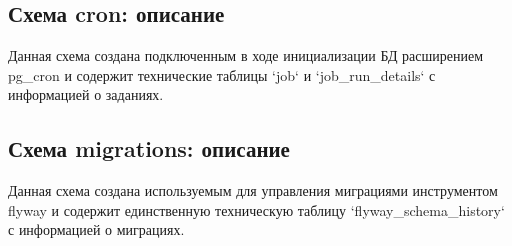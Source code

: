 \subsection{Схема cron: описание}\label{subsec:crondesc}

Данная схема создана подключенным в ходе инициализации БД расширением pg\_cron и содержит технические таблицы
`job` и `job\_run\_details` с информацией о заданиях.

\subsection{Схема migrations: описание}\label{subsec:migrationsdesc}

Данная схема создана используемым для управления миграциями инструментом flyway и содержит
единственную техническую таблицу `flyway\_schema\_history` с информацией о миграциях.